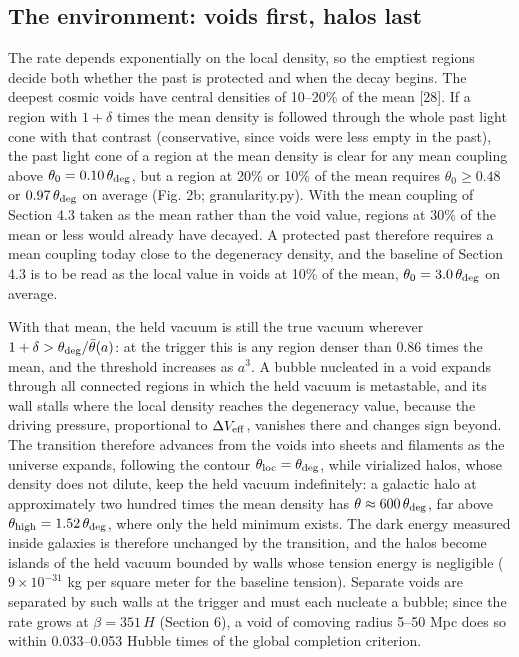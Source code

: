 \documentclass[preprint,12pt]{elsarticle}
\begin{document}
\subsection{The environment: voids first, halos last}
The rate depends exponentially on the local density, so the emptiest regions decide both whether the past is protected and when the decay begins. The deepest cosmic voids have central densities of 10--20\% of the mean [28]. If a region with $1+\delta$ times the mean density is followed through the whole past light cone with that contrast (conservative, since voids were less empty in the past), the past light cone of a region at the mean density is clear for any mean coupling above $\theta_0=0.10\,\theta_{\rm deg}$, but a region at 20\% or 10\% of the mean requires $\theta_0\ge0.48$ or $0.97\,\theta_{\rm deg}$ on average (Fig. 2b; granularity.py). With the mean coupling of Section 4.3 taken as the mean rather than the void value, regions at 30\% of the mean or less would already have decayed. A protected past therefore requires a mean coupling today close to the degeneracy density, and the baseline of Section 4.3 is to be read as the local value in voids at 10\% of the mean, $\theta_0=3.0\,\theta_{\rm deg}$ on average.

With that mean, the held vacuum is still the true vacuum wherever $1+\delta>\theta_{\rm deg}/\bar\theta(a)$: at the trigger this is any region denser than 0.86 times the mean, and the threshold increases as $a^3$. A bubble nucleated in a void expands through all connected regions in which the held vacuum is metastable, and its wall stalls where the local density reaches the degeneracy value, because the driving pressure, proportional to $\Delta V_{\rm eff}$, vanishes there and changes sign beyond. The transition therefore advances from the voids into sheets and filaments as the universe expands, following the contour $\theta_{\rm loc}=\theta_{\rm deg}$, while virialized halos, whose density does not dilute, keep the held vacuum indefinitely: a galactic halo at approximately two hundred times the mean density has $\theta\approx600\,\theta_{\rm deg}$, far above $\theta_{\rm high}=1.52\,\theta_{\rm deg}$, where only the held minimum exists. The dark energy measured inside galaxies is therefore unchanged by the transition, and the halos become islands of the held vacuum bounded by walls whose tension energy is negligible ($9\times10^{-31}$ kg per square meter for the baseline tension). Separate voids are separated by such walls at the trigger and must each nucleate a bubble; since the rate grows at $\beta=351\,H$ (Section 6), a void of comoving radius 5--50 Mpc does so within 0.033--0.053 Hubble times of the global completion criterion.
\end{document}
